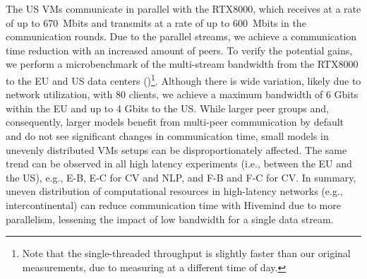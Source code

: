 The US VMs communicate in parallel with the RTX8000, which receives at a rate of up to 670~Mbits and transmits at a rate of up to 600~Mbits in the communication rounds.
Due to the parallel streams, we achieve a communication time reduction with an increased amount of peers.
To verify the potential gains, we perform a microbenchmark of the multi-stream bandwidth from the RTX8000 to the EU and US data centers ()\footnote{Note that the single-threaded throughput is slightly faster than our original measurements, due to measuring at a different time of day.}.
Although there is wide variation, likely due to network utilization, with 80 clients, we achieve a maximum bandwidth of 6 Gbits within the EU and up to 4 Gbits to the US. 
While larger peer groups and, consequently, larger models benefit from multi-peer communication by default and do not see significant changes in communication time, small models in unevenly distributed VMs setups can be disproportionately affected.
The same trend can be observed in all high latency experiments (i.e., between the EU and the US), e.g., E-B, E-C for CV and NLP, and F-B and F-C for CV.
In summary, uneven distribution of computational resources in high-latency networks (e.g., intercontinental) can reduce communication time with Hivemind due to more parallelism, lessening the impact of low bandwidth for a single data stream.

